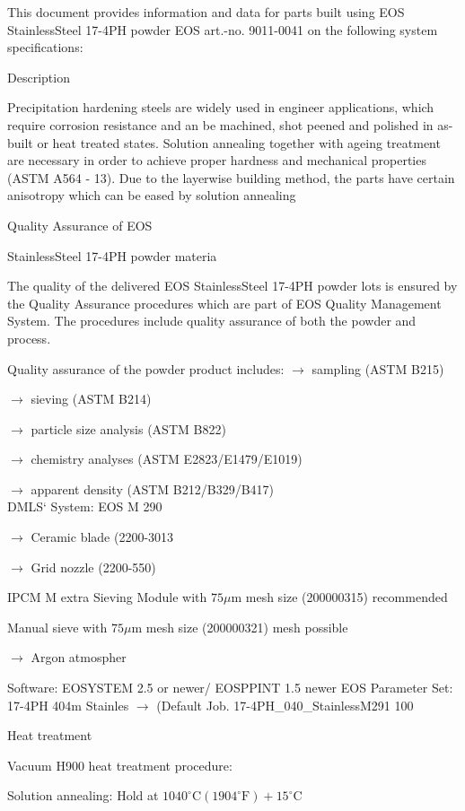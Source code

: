 \documentclass[10pt]{article}
\begin{document}
This document provides information and data for parts built using EOS StainlessSteel 17-4PH powder EOS art.-no. 9011-0041 on the following system specifications:

Description

Precipitation hardening steels are widely used in engineer applications, which require corrosion resistance and an be machined, shot peened and polished in as-built or heat treated states. Solution annealing together with ageing treatment are necessary in order to achieve proper hardness and mechanical properties (ASTM A564 - 13). Due to the layerwise building method, the parts have certain anisotropy which can be eased by solution annealing

Quality Assurance of EOS

StainlessSteel 17-4PH powder materia

The quality of the delivered EOS StainlessSteel 17-4PH powder lots is ensured by the Quality Assurance procedures which are part of EOS Quality Management System. The procedures include quality assurance of both the powder and process.

Quality assurance of the powder product includes: $\rightarrow$ sampling (ASTM B215)

$\rightarrow$ sieving (ASTM B214)

$\longrightarrow$ particle size analysis (ASTM B822)

$\rightarrow$ chemistry analyses (ASTM E2823/E1479/E1019)

$\rightarrow$ apparent density (ASTM B212/B329/B417)\\
DMLS` System: EOS M 290

$\rightarrow$ Ceramic blade (2200-3013

$\rightarrow$ Grid nozzle (2200-550)

IPCM M extra Sieving Module with $75 \mu \mathrm{m}$ mesh size (200000315) recommended

Manual sieve with $75 \mu \mathrm{m}$ mesh size (200000321) mesh possible

$\rightarrow$ Argon atmospher

Software: EOSYSTEM 2.5 or newer/ EOSPPINT 1.5 newer EOS Parameter Set: 17-4PH 404m Stainles $\rightarrow$ (Default Job. 17-4PH\_040\_StainlessM291 100

Heat treatment

Vacuum H900 heat treatment procedure:

Solution annealing: Hold at $1040^{\circ} \mathrm{C}\left(1904^{\circ} \mathrm{F}\right)+15^{\circ} \mathrm{C}$
\end{document}
